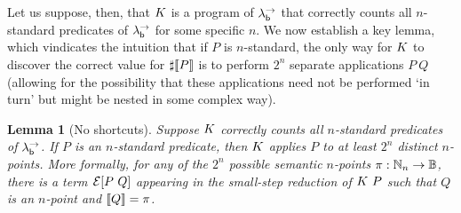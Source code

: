 \documentclass[12pt,phd,lfcs,twoside,openright,logo,leftchapter,normalheadings]{infthesis}
\theoremstyle{plain}
\newtheorem{lemma}[theorem]{Lemma}
\theoremstyle{definition}
\begin{document}
Let us suppose, then, that $K$ is a program of $\lambda^\rightarrow_{\mathsf{b}}$ that correctly counts
all $n$-standard predicates of $\lambda^\rightarrow_{\mathsf{b}}$ for some specific $n$.
We now establish a key lemma, which vindicates the \naive intuition
that if $P$ is $n$-standard, the only way for $K$ to discover the correct
value for $\sharp \val{P}$ is to perform $2^n$ separate applications $P~Q$
(allowing for the possibility that these applications need not
be performed `in turn' but might be nested in some complex way).

\begin{lemma}[No shortcuts]\label{lem:no-shortcuts}
  Suppose $K$ correctly counts all $n$-standard predicates of $\lambda^\rightarrow_{\mathsf{b}}$.
  If $P$ is an $n$-standard predicate,
  then $K$ applies $P$ to at least $2^n$ distinct $n$-points.
  More formally, for any of the $2^n$ possible semantic $n$-points
  $\pi : \mathbb{N}_n \to \mathbb{B}$, there is a term $\mathcal{E}[P~Q]$ appearing in the
  small-step reduction of $K~P$ such that $Q$ is an $n$-point and $\llbracket Q \rrbracket = \pi$.
\end{lemma}
\end{document}
